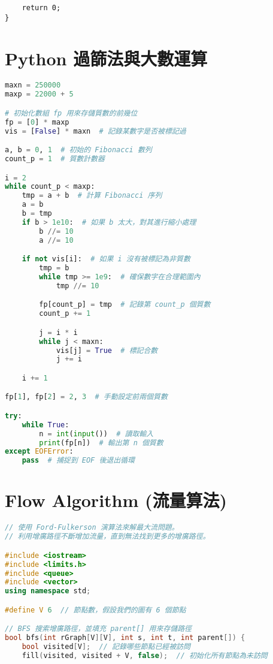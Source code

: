 \documentclass{article}
\begin{document}
\begin{multicols}{2}
\begin{lstlisting}
    return 0;
}
\end{lstlisting}

\section{Python 過篩法與大數運算}

\begin{lstlisting}[language=Python]
maxn = 250000
maxp = 22000 + 5

# 初始化數組 fp 用來存儲質數的前幾位
fp = [0] * maxp
vis = [False] * maxn  # 記錄某數字是否被標記過

a, b = 0, 1  # 初始的 Fibonacci 數列
count_p = 1  # 質數計數器

i = 2
while count_p < maxp:
    tmp = a + b  # 計算 Fibonacci 序列
    a = b
    b = tmp
    if b > 1e10:  # 如果 b 太大，對其進行縮小處理
        b //= 10
        a //= 10

    if not vis[i]:  # 如果 i 沒有被標記為非質數
        tmp = b
        while tmp >= 1e9:  # 確保數字在合理範圍內
            tmp //= 10

        fp[count_p] = tmp  # 記錄第 count_p 個質數
        count_p += 1

        j = i * i
        while j < maxn:
            vis[j] = True  # 標記合數
            j += i

    i += 1

fp[1], fp[2] = 2, 3  # 手動設定前兩個質數

try:
    while True:
        n = int(input())  # 讀取輸入
        print(fp[n])  # 輸出第 n 個質數
except EOFError:
    pass  # 捕捉到 EOF 後退出循環
\end{lstlisting}

\section{Flow Algorithm (流量算法)}

\begin{lstlisting}[language=C++]
// 使用 Ford-Fulkerson 演算法來解最大流問題。
// 利用增廣路徑不斷增加流量，直到無法找到更多的增廣路徑。

#include <iostream>
#include <limits.h>
#include <queue>
#include <vector>
using namespace std;

#define V 6  // 節點數，假設我們的圖有 6 個節點

// BFS 搜索增廣路徑，並填充 parent[] 用來存儲路徑
bool bfs(int rGraph[V][V], int s, int t, int parent[]) {
    bool visited[V];  // 記錄哪些節點已經被訪問
    fill(visited, visited + V, false);  // 初始化所有節點為未訪問


\end{lstlisting}
\end{multicols}
\end{document}
